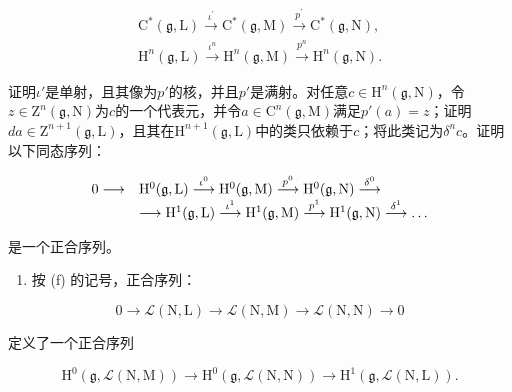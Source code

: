 \[
\begin{array}{l} \mathrm{C} ^ {*} (\mathfrak {g}, \mathrm{L}) \xrightarrow {\iota^ {\prime}} \mathrm{C} ^ {*} (\mathfrak {g}, \mathrm{M}) \xrightarrow {p ^ {\prime}} \mathrm{C} ^ {*} (\mathfrak {g}, \mathrm{N}), \\ \mathrm{H} ^ {n} (\mathfrak {g}, \mathrm{L}) \xrightarrow {\iota^ {n}} \mathrm{H} ^ {n} (\mathfrak {g}, \mathrm{M}) \xrightarrow {p ^ {n}} \mathrm{H} ^ {n} (\mathfrak {g}, \mathrm{N}). \end{array}
\]

证明\(\iota'\)是单射，且其像为\(p'\)的核，并且\(p'\)是满射。对任意\(c \in \mathrm{H}^n(\mathfrak{g},\mathrm{N})\)，令\(z \in \mathrm{Z}^n(\mathfrak{g},\mathrm{N})\)为\(c\)的一个代表元，并令\(a \in \mathrm{C}^n(\mathfrak{g},\mathrm{M})\)满足\(p'(a) = z\)；证明\(da \in \mathrm{Z}^{n+1}(\mathfrak{g},\mathrm{L})\)，且其在\(\mathrm{H}^{n+1}(\mathfrak{g},\mathrm{L})\)中的类只依赖于\(c\)；将此类记为\(\delta^n c\)。证明以下同态序列：

\[
\begin{array}{r l} 0 \longrightarrow & \mathrm{H} ^ {0} (\mathfrak {g}, \mathrm{L}) \stackrel {{\iota ^ {0}}} {{\longrightarrow}} \mathrm{H} ^ {0} (\mathfrak {g}, \mathrm{M}) \stackrel {{p ^ {0}}} {{\longrightarrow}} \mathrm{H} ^ {0} (\mathfrak {g}, \mathrm{N}) \stackrel {{\delta^ {0}}} {{\longrightarrow}} \\ & \longrightarrow \mathrm{H} ^ {1} (\mathfrak {g}, \mathrm{L}) \stackrel {{\iota ^ {1}}} {{\longrightarrow}} \mathrm{H} ^ {1} (\mathfrak {g}, \mathrm{M}) \stackrel {{p ^ {1}}} {{\longrightarrow}} \mathrm{H} ^ {1} (\mathfrak {g}, \mathrm{N}) \stackrel {{\delta^ {1}}} {{\longrightarrow}} \dots \end{array}
\]

是一个正合序列。

\begin{enumerate}
\def\labelenumi{(\alph{enumi})}
\setcounter{enumi}{6}
\tightlist
\item
  按 (f) 的记号，正合序列：
\end{enumerate}

\[
0 \to \mathscr {L} (\mathrm{N}, \mathrm{L}) \to \mathscr {L} (\mathrm{N}, \mathrm{M}) \to \mathscr {L} (\mathrm{N}, \mathrm{N}) \to 0
\]

定义了一个正合序列

\[
\mathrm{H} ^ {0} (\mathfrak {g}, \mathscr {L} (\mathrm{N}, \mathrm{M})) \rightarrow \mathrm{H} ^ {0} (\mathfrak {g}, \mathscr {L} (\mathrm{N}, \mathrm{N})) \rightarrow \mathrm{H} ^ {1} (\mathfrak {g}, \mathscr {L} (\mathrm{N}, \mathrm{L})).
\]

